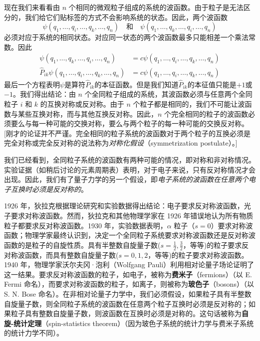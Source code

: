     现在我们来看看由 $n$ 个相同的微观粒子组成的系统的波函数。由于粒子是无法区分的，我们给它们贴标签的方式不会影响系统的状态。因此，两个波函数
    \begin{equation*}
        \psi\left(q_1, \ldots, q_i, \ldots, q_k, \ldots, q_n\right) \quad \text{和} \quad \psi\left(q_1, \ldots, q_k, \ldots, q_i, \ldots, q_n\right)
    \end{equation*}
    必须对应于系统的相同状态。对应同一状态的两个波函数最多只能相差一个乘法常数。因此
    \begin{equation*}
        \begin{aligned}
            \psi\left(q_1, \ldots, q_k, \ldots, q_i, \ldots, q_n\right) &= c \psi\left(q_1, \ldots, q_i, \ldots, q_k, \ldots, q_n\right) \\
            \hat{P}_{ik} \psi\left(q_1, \ldots, q_i, \ldots, q_k, \ldots, q_n\right) &= c \psi\left(q_1, \ldots, q_i, \ldots, q_k, \ldots, q_n\right)
        \end{aligned}
    \end{equation*}
    最后一个方程表明$\psi$是算符$\hat{P}_{ik}$的本征函数。但是我们知道$\hat{P}_{ik}$的本征值只能是$+1$或$-1$。我们得出结论：由 $n$ 个全同粒子组成的系统，其波函数必须与任意两个全同粒子 $i$ 和 $k$ 的互换对称或反对称。由于 $n$ 个粒子都是相同的，我们不可能让波函数与某些互换对称，而与其他互换反对称。因此，$n$ 个完全相同的粒子的波函数必须要么与每一种可能的交换对称，要么与两个粒子的每一种可能的交换反对称。[刚才的论证并不严谨。完全相同的粒子系统的波函数对于两个粒子的互换必须是完全对称或完全反对称的说法称为\textit{对称化假设}（symmetrization postulate）。]

    我们已经看到，全同粒子系统的波函数有两种可能的情况，即对称和非对称情况。实验证据（如稍后讨论的元素周期表）表明，对于电子来说，只有反对称情况才会出现。因此，我们有了量子力学的另一个假设，即\textit{电子系统的波函数在任意两个电子互换时必须是反对称的}。

    1926 年，狄拉克根据理论研究和实验数据得出结论：电子要求反对称波函数，光子要求对称波函数。然而，狄拉克和其他物理学家在 1926 年错误地认为所有物质粒子都要求反对称波函数。1930 年，实验数据表明，$\alpha$ 粒子（$s=0$）要求对称波函数；物理学家最终认识到，决定一个全同粒子系统要求对称波函数还是反对称波函数的是粒子的自旋性质。具有半整数自旋量子数($s = \frac{1}{2}, \frac{3}{2}$，等等)的粒子要求反对称波函数，而具有整数自旋量子数($s = 0, 1, 2$，等等)的粒子要求对称波函数。1940 年，物理学家沃尔夫冈·泡利（Wolfgang Pauli）利用相对论量子场论证明了这一结果。要求反对称波函数的粒子，如电子，被称为\textbf{费米子}（fermions）（以 E. Fermi 命名），而要求对称波函数的粒子，如离子，则被称为\textbf{玻色子}（bosons）（以 S. N. Bose 命名）。在非相对论量子力学中，我们必须假设，如果粒子具有半整数自旋量子数，则全同粒子系统的波函数在任意两个粒子互换时必须是反对称的；如果粒子具有整数自旋量子数，则波函数在互换时必须是对称的。这句话被称为\textbf{自旋-统计定理}（spin-statistics theorem）（因为玻色子系统的统计力学与费米子系统的统计力学不同）。

